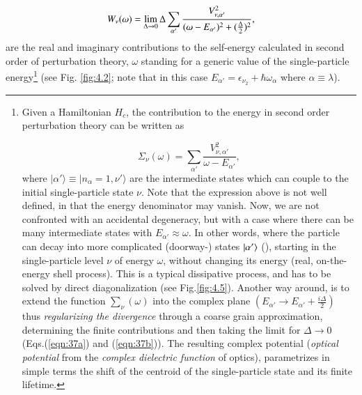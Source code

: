 \begin{equation}
W_\nu(\omega)  = \lim_{\Delta \rightarrow 0}\Delta \sum_{\alpha'} \frac{V_{\nu ,\alpha'}^2}{(\omega -E_{\alpha'})^2 + (\frac{\Delta}{2})^2}, \idx{Particle-vibration coupling!single-particle renormalization}
\label{eqn:37b}
\end{equation}
are the real and imaginary contributions  to the self-energy calculated in second order of perturbation theory,  $\omega$ standing for a generic value of the single-particle energy\footnote{Given a Hamiltonian $H_{c}$, the contribution to the energy in second order perturbation theory can be written as

{\protect
\begin{equation}
\nonumber\Sigma_{\nu}(\omega) = \sum_{\alpha'} \frac{V_{\nu ,\alpha'}^2}{\omega - E_{\alpha'}} ,
\label{eqn:37c}
\end{equation}
}
where $|\alpha' \rangle \equiv |n_{\alpha}=1,\nu' \rangle$ are the intermediate states which can couple to the initial single-particle state $\nu$. Note that the expression above is not well defined, in that the energy denominator may vanish. Now, we are not confronted with an accidental degeneracy, but with a   case where there can be many intermediate states with $E_{\alpha'} \approx \omega$. In other words, where the particle can decay into  more complicated (doorway-) states $|{\alpha'} \rangle$  (\cite{Feshbach:58}), starting in the single-particle level $\nu$ of energy $\omega$, without changing its energy (real, on-the-energy shell process). This is a typical dissipative  process, and has to be solved by direct diagonalization (see Fig.\ref{fig:4.5}). Another way around, is to extend the function $\sum_{\nu}(\omega)$ into the complex plane $(E_{\alpha'} \rightarrow E_{\alpha'} + \frac{i\Delta}{2})$ thus {\it regularizing the divergence} through a coarse grain approximation, determining the finite contributions and then taking the limit for $\Delta \rightarrow 0$ (Eqs.(\ref{eqn:37a}) and (\ref{eqn:37b})). The resulting complex potential ({\it optical potential} from the {\it complex dielectric function} of optics), parametrizes in simple terms the shift of the centroid of the single-particle state and its finite lifetime.} (see Fig. \ref{fig:4.2}; note that in this case $E_{\alpha'}=\epsilon_{\nu_2}+\hbar\omega_\alpha$ where $\alpha\equiv\lambda$).


